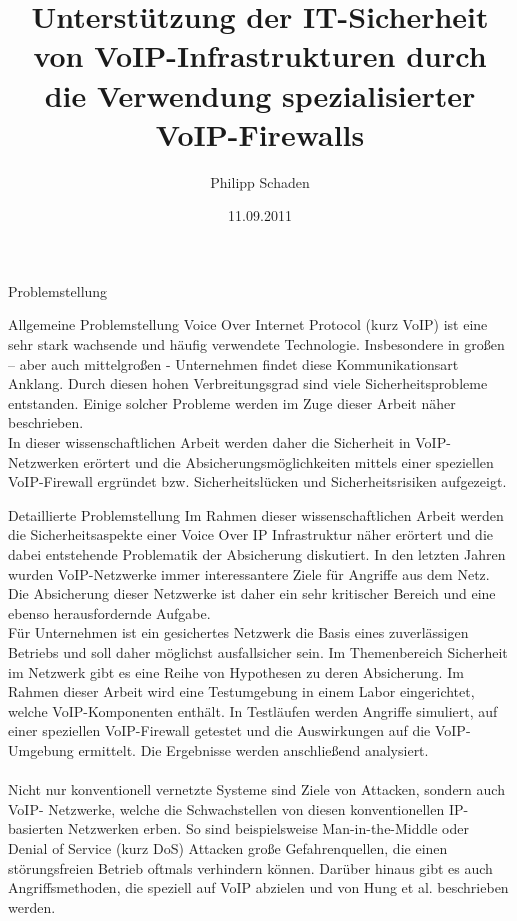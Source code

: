 \documentclass[a4paper,11pt,ngerman]{INSOexpose}
\title{Unterstützung der IT-Sicherheit von VoIP-Infrastrukturen durch die Verwendung spezialisierter VoIP-Firewalls}
\author{Philipp Schaden}
\date{11.09.2011}
\providecommand{\DIFadd}[1]{{\protect\color{blue}\uwave{#1}}} %
\providecommand{\DIFaddbegin}{} %
\providecommand{\DIFaddend}{} %
\begin{document}
\maketitle

\begin{section}{Problemstellung}
\begin{subsection}{Allgemeine Problemstellung}
Voice Over Internet Protocol (kurz VoIP) ist eine sehr stark wachsende und häufig verwendete Technologie. Insbesondere in großen – aber auch mittelgroßen - Unternehmen findet diese Kommunikationsart Anklang.
Durch diesen hohen Verbreitungsgrad sind viele Sicherheitsprobleme entstanden.
Einige solcher Probleme werden im Zuge dieser Arbeit näher beschrieben.
\\
In dieser wissenschaftlichen Arbeit werden daher die Sicherheit in VoIP-Netzwerken erörtert und die Absicherungsmöglichkeiten mittels einer speziellen VoIP-Firewall ergründet bzw. Sicherheitslücken und Sicherheitsrisiken aufgezeigt.
\end{subsection}
\begin{subsection}{Detaillierte Problemstellung}
Im Rahmen dieser wissenschaftlichen Arbeit werden die Sicherheitsaspekte einer Voice Over IP Infrastruktur näher erörtert und die dabei entstehende Problematik der Absicherung diskutiert.
In den letzten Jahren wurden VoIP-Netzwerke immer interessantere Ziele für Angriffe aus dem Netz. Die Absicherung dieser Netzwerke ist daher ein sehr kritischer Bereich und eine ebenso herausfordernde Aufgabe.
\\
Für Unternehmen ist ein gesichertes Netzwerk die Basis eines zuverlässigen Betriebs und soll daher möglichst ausfallsicher sein.
Im Themenbereich Sicherheit im Netzwerk gibt es eine Reihe von Hypothesen zu deren Absicherung. Im Rahmen dieser Arbeit wird eine Testumgebung in einem Labor eingerichtet, welche VoIP-Komponenten enthält. In Testläufen werden Angriffe simuliert, auf einer speziellen VoIP-Firewall getestet und die Auswirkungen auf die VoIP-Umgebung ermittelt.
Die Ergebnisse werden anschließend analysiert.
\\
\\
Nicht nur konventionell vernetzte Systeme sind Ziele von Attacken, sondern auch VoIP- Netzwerke, welche die Schwachstellen von diesen konventionellen IP-basierten Netzwerken erben.
So sind beispielsweise Man-in-the-Middle oder Denial of Service (kurz DoS) Attacken große Gefahrenquellen, die einen störungsfreien Betrieb oftmals verhindern können. Darüber hinaus gibt es auch Angriffsmethoden, die speziell auf VoIP abzielen und \DIFaddbegin \DIFadd{z.B. }\DIFaddend von Hung et al. beschrieben werden.
\cite{Hung:2006:seciss} \\ 
\end{subsection}
\end{section}
\pagebreak
\end{document}
